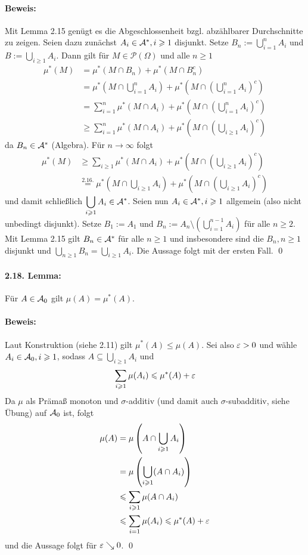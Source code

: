 \documentclass[12pt]{report}
\begin{document}
\paragraph{Beweis:}Mit Lemma 2.15 gen\"ugt es die Abgeschlossenheit bzgl. abz\"ahlbarer Durchschnitte zu zeigen. Seien dazu zun\"achst $A_i\in\mathcal{A}^*,i\geqslant1$ disjunkt. Setze $B_n:=\displaystyle\bigcup_{i=1}^nA_i$ und $\displaystyle B:=\bigcup_{i\geq1}A_i$. Dann gilt f\"ur $M\in\mathcal{P}(\Omega)$ und alle $n\geq1$
\begin{align*}
    \mu^*(M)&=\mu^*(M\cap B_n)+\mu^*(M\cap B_n^c)\\
    &=\mu^*\left(M\cap\bigcup_{i=1}^nA_i\right)+\mu^*\left(M\cap\left(\bigcup_{i=1}^nA_i\right)^c\right)\\
    &=\sum_{i=1}^n\mu^*(M\cap A_i)+\mu^*\left(M\cap\left(\bigcup_{i=1}^nA_i\right)^c\right)\\
    &\geq\sum_{i=1}^n\mu^*(M\cap A_i)+\mu^*\left(M\cap\left(\bigcup_{i\geq1}A_i\right)^c\right)
\end{align*}
da $B_n\in\mathcal{A}^*$ (Algebra). F\"ur $n\to\infty$ folgt 
\begin{align*}
    \mu^*(M)&\geq\sum_{i\geq1}\mu^*(M\cap A_i)+\mu^*\left(M\cap\left(\bigcup_{i\geq1}A_i\right)^c\right)\\
    &\overset{2.16.}{=}\mu^*\left(M\cap\bigcup_{i\geq1}A_i\right)+\mu^*\left(M\cap\left(\bigcup_{i\geq1}A_i\right)^c\right)
\end{align*}
und damit schlie\ss{}lich $\displaystyle\bigcup_{i\geqslant1}A_i\in\mathcal{A}^*$.\newline\newline
Seien nun $A_i\in\mathcal{A}^*,i\geqslant1$ allgemein (also nicht unbedingt disjunkt). Setze $B_1:=A_1$ und $\displaystyle B_n:=A_n\setminus\left(\bigcup_{i=1}^{n-1}A_i\right)$ f\"ur alle $n\geq2$. Mit Lemma 2.15 gilt $B_n\in\mathcal{A}^*$ f\"ur alle $n\geq1$ und insbesondere sind die $B_n,n\geq1$ disjunkt und $\displaystyle\bigcup_{n\geq1}B_n=\bigcup_{i\geq1}A_i$. Die Aussage folgt mit der ersten Fall. \qed

\paragraph{2.18. Lemma:}F\"ur $A\in\mathcal{A}_0$ gilt $\mu(A)=\mu^*(A)$.

\paragraph{Beweis:}Laut Konstruktion (siehe 2.11) gilt $\mu^*(A)\leq\mu(A)$. Sei also $\varepsilon>0$ und w\"ahle $A_i\in\mathcal{A}_0,i\geqslant1$, sodass $A\displaystyle\subseteq\bigcup_{i\geq1}A_i$ und
$$\sum_{i\geqslant1}\mu(A_i)\leqslant\mu^*(A)+\varepsilon$$
Da $\mu$ als Pr\"ama\ss{} monoton und $\sigma$-additiv (und damit auch $\sigma$-subadditiv, siehe \"Ubung) auf $\mathcal{A}_0$ ist, folgt
\begin{align*}
    \mu(A)&=\mu\left(A\cap\bigcup_{i\geqslant1}A_i\right)\\&=\mu\left(\bigcup_{i\geqslant1}(A\cap A_i)\right)\\&\leqslant\sum_{i\geqslant1}\mu(A\cap A_i)\\
    &\leqslant\sum_{i=1}\mu(A_i)\leqslant\mu^*(A)+\varepsilon
\end{align*}
und die Aussage folgt f\"ur $\varepsilon\searrow0$. \qed
\end{document}
